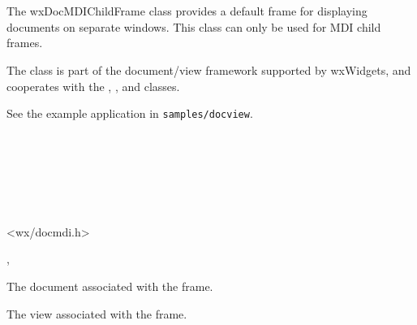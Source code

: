 \section{}\label{wxdocmdichildframe}

The wxDocMDIChildFrame class provides a default frame for displaying documents
on separate windows. This class can only be used for MDI child frames.

The class is part of the document/view framework supported by wxWidgets,
and cooperates with the , ,
\rtfsp{} and  classes.

See the example application in {\tt samples/docview}.


\\
\\
\\
\\
\\


<wx/docmdi.h>




, 




\label{wxdocmdichildframemchilddocument}


The document associated with the frame.

\label{wxdocmdichildframemchildview}


The view associated with the frame.

\label{wxdocmdichildframector}


